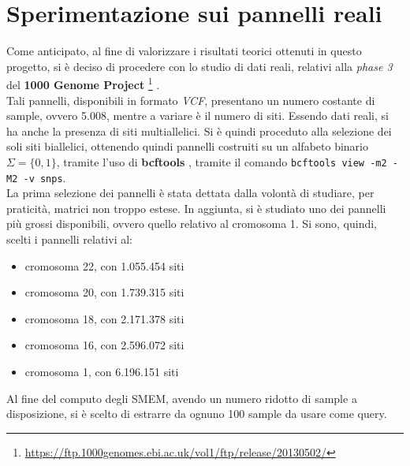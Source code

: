 \section{Sperimentazione sui pannelli reali}
Come anticipato, al fine di valorizzare i risultati teorici ottenuti in
questo progetto, si 
è deciso di procedere con lo studio di dati reali, relativi alla \textit{phase
  3} del \textbf{1000 Genome Project}
\footnote{\url{https://ftp.1000genomes.ebi.ac.uk/vol1/ftp/release/20130502/}}
\cite{1kgp}.\\ 
Tali pannelli, disponibili in formato \textit{VCF}, presentano un numero
costante di sample, ovvero 5.008, mentre a variare è il numero di siti. Essendo
dati reali, si ha anche la presenza di siti multiallelici. Si è quindi proceduto
alla selezione dei soli siti biallelici, ottenendo quindi pannelli costruiti su
un alfabeto binario $\Sigma=\{0,1\}$, tramite l'uso di \textbf{bcftools}
\cite{bcftools}, tramite il comando \texttt{bcftools view -m2 -M2
  -v snps}.\\
La prima selezione dei pannelli è stata dettata dalla volontà di studiare, per
praticità, matrici non troppo estese. In aggiunta, si è studiato uno dei
pannelli più grossi disponibili, ovvero quello relativo al cromosoma 1. Si sono,
quindi, scelti i pannelli relativi al:
\begin{itemize}
  \item cromosoma 22, con 1.055.454 siti
  \item cromosoma 20, con 1.739.315 siti
  \item cromosoma 18, con 2.171.378 siti
  \item cromosoma 16, con 2.596.072 siti
  \item cromosoma 1, con 6.196.151 siti
\end{itemize}
Al fine del computo degli SMEM, avendo un numero ridotto di sample a
disposizione, si è scelto di estrarre da ognuno 100 sample da usare come
query.
